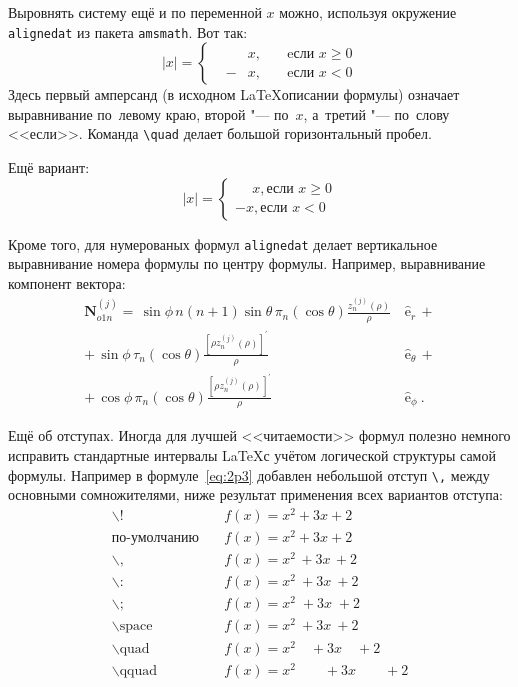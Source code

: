 Выровнять систему ещё и по переменной $ x $ можно, используя окружение \verb|alignedat| из пакета \verb|amsmath|. Вот так: 
\[
    |x| = \left\{
    \begin{alignedat}{2}
        &&x, \quad &\text{eсли } x\geqslant 0 \\
        &-&x, \quad & \text{eсли } x<0
    \end{alignedat}
    \right.
\]
Здесь первый амперсанд (в исходном \LaTeX описании формулы) означает выравнивание по~левому краю, второй "--- по~$ x $, а~третий "--- по~слову <<если>>. Команда \verb|\quad| делает большой горизонтальный пробел.

Ещё вариант:
\[
    |x|=
    \begin{cases}
    \phantom{-}x, \text{если } x \geqslant 0 \\
    -x, \text{если } x<0
    \end{cases}
\]

Кроме того, для  нумерованых формул \verb|alignedat|  делает вертикальное
выравнивание номера формулы по центру формулы. Например,  выравнивание компонент вектора:
\begin{equation}
 \label{eq:2p3}
 \begin{alignedat}{2}
{\mathbf{N}}_{o1n}^{(j)} = \,{\sin} \phi\,n\!\left(n+1\right)
         {\sin}\theta\,
         \pi_n\!\left({\cos} \theta\right)
         \frac{
               z_n^{(j)}\!\left( \rho \right)
              }{\rho}\,
           &{\boldsymbol{\hat{\mathrm e}}}_{r}\,+   \\
+\,
{\sin} \phi\,
         \tau_n\!\left({\cos} \theta\right)
         \frac{
            \left[\rho z_n^{(j)}\!\left( \rho \right)\right]^{\prime}
              }{\rho}\,
            &{\boldsymbol{\hat{\mathrm e}}}_{\theta}\,+   \\
+\,
{\cos} \phi\,
         \pi_n\!\left({\cos} \theta\right)
         \frac{
            \left[\rho z_n^{(j)}\!\left( \rho \right)\right]^{\prime}
              }{\rho}\,
            &{\boldsymbol{\hat{\mathrm e}}}_{\phi}\:.
\end{alignedat}
\end{equation}

Ещё об отступах. Иногда для лучшей <<читаемости>> формул полезно
немного исправить стандартные интервалы \LaTeX с учётом логической
структуры самой формулы. Например в формуле~\ref{eq:2p3} добавлен
небольшой отступ \verb+\,+ между основными сомножителями, ниже
результат применения всех вариантов отступа:
\begin{align*}
\backslash! &\quad f(x) = x^2\! +3x\! +2 \\
  \mbox{по-умолчанию} &\quad f(x) = x^2+3x+2 \\
\backslash, &\quad f(x) = x^2\, +3x\, +2 \\
\backslash{:} &\quad f(x) = x^2\: +3x\: +2 \\
\backslash; &\quad f(x) = x^2\; +3x\; +2 \\
\backslash \mbox{space} &\quad f(x) = x^2\ +3x\ +2 \\
\backslash \mbox{quad} &\quad f(x) = x^2\quad +3x\quad +2 \\
\backslash \mbox{qquad} &\quad f(x) = x^2\qquad +3x\qquad +2
\end{align*}


